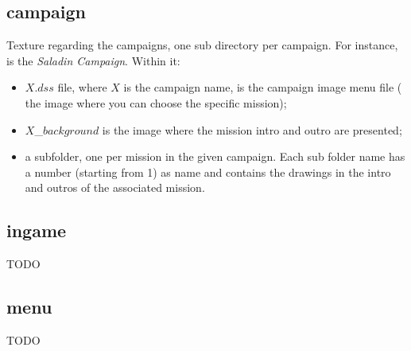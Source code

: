     \subsection{campaign}

    Texture regarding the campaigns, one sub directory per campaign. For instance,  is the \textit{Saladin Campaign}. Within it:
    \begin{itemize}
        \item $X.dss$ file, where $X$ is the campaign name, is the campaign image menu file (\ie{} the image where you can choose the specific mission);
        \item $X$\_$background$ is the image where the mission intro and outro are presented;
        \item a subfolder, one per mission in the given campaign. Each sub folder name has a number (starting from 1) as name and contains the drawings in the intro and outros of the associated mission.
    \end{itemize}

    \subsection{ingame}

    TODO

    \subsection{menu}

    TODO